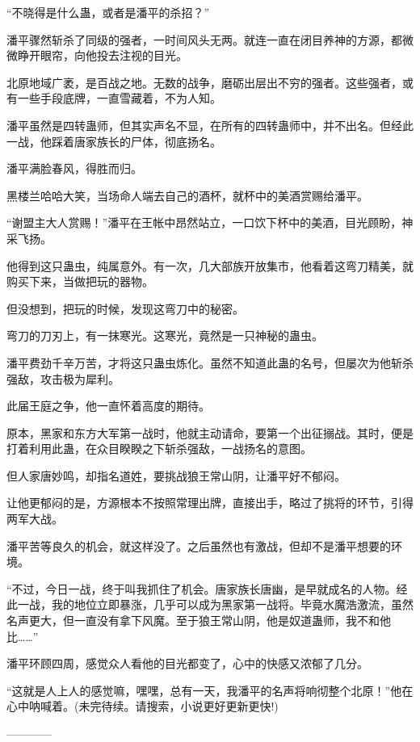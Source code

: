 \begin{this_body}
“不晓得是什么蛊，或者是潘平的杀招？”

潘平骤然斩杀了同级的强者，一时间风头无两。就连一直在闭目养神的方源，都微微睁开眼帘，向他投去注视的目光。

北原地域广袤，是百战之地。无数的战争，磨砺出层出不穷的强者。这些强者，或有一些手段底牌，一直雪藏着，不为人知。

潘平虽然是四转蛊师，但其实声名不显，在所有的四转蛊师中，并不出名。但经此一战，他踩着唐家族长的尸体，彻底扬名。

潘平满脸春风，得胜而归。

黑楼兰哈哈大笑，当场命人端去自己的酒杯，就杯中的美酒赏赐给潘平。

“谢盟主大人赏赐！”潘平在王帐中昂然站立，一口饮下杯中的美酒，目光顾盼，神采飞扬。

他得到这只蛊虫，纯属意外。有一次，几大部族开放集市，他看着这弯刀精美，就购买下来，当做把玩的器物。

但没想到，把玩的时候，发现这弯刀中的秘密。

弯刀的刀刃上，有一抹寒光。这寒光，竟然是一只神秘的蛊虫。

潘平费劲千辛万苦，才将这只蛊虫炼化。虽然不知道此蛊的名号，但屡次为他斩杀强敌，攻击极为犀利。

此届王庭之争，他一直怀着高度的期待。

原本，黑家和东方大军第一战时，他就主动请命，要第一个出征搦战。其时，便是打着利用此蛊，在众目睽睽之下斩杀强敌，一战扬名的意图。

但人家唐妙鸣，却指名道姓，要挑战狼王常山阴，让潘平好不郁闷。

让他更郁闷的是，方源根本不按照常理出牌，直接出手，略过了挑将的环节，引得两军大战。

潘平苦等良久的机会，就这样没了。之后虽然也有激战，但却不是潘平想要的环境。

“不过，今日一战，终于叫我抓住了机会。唐家族长唐幽，是早就成名的人物。经此一战，我的地位立即暴涨，几乎可以成为黑家第一战将。毕竟水魔浩激流，虽然名声更大，但一直没有拿下风魔。至于狼王常山阴，他是奴道蛊师，我不和他比……”

潘平环顾四周，感觉众人看他的目光都变了，心中的快感又浓郁了几分。

“这就是人上人的感觉嘛，嘿嘿，总有一天，我潘平的名声将响彻整个北原！”他在心中呐喊着。(未完待续。请搜索，小说更好更新更快!)

------------

\end{this_body}

